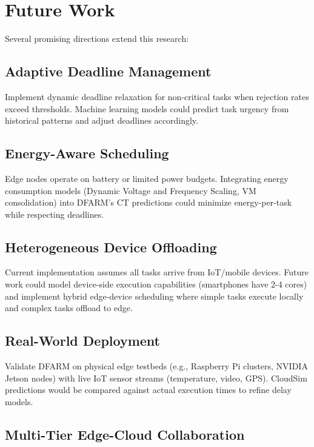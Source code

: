 \documentclass[12pt]{report}
\begin{document}
\section{Future Work}

Several promising directions extend this research:

\subsection{Adaptive Deadline Management}

Implement dynamic deadline relaxation for non-critical tasks when rejection rates exceed thresholds. Machine learning models could predict task urgency from historical patterns and adjust deadlines accordingly.

\subsection{Energy-Aware Scheduling}

Edge nodes operate on battery or limited power budgets. Integrating energy consumption models (Dynamic Voltage and Frequency Scaling, VM consolidation) into DFARM's CT predictions could minimize energy-per-task while respecting deadlines.

\subsection{Heterogeneous Device Offloading}

Current implementation assumes all tasks arrive from IoT/mobile devices. Future work could model device-side execution capabilities (smartphones have 2-4 cores) and implement hybrid edge-device scheduling where simple tasks execute locally and complex tasks offload to edge.

\subsection{Real-World Deployment}

Validate DFARM on physical edge testbeds (e.g., Raspberry Pi clusters, NVIDIA Jetson nodes) with live IoT sensor streams (temperature, video, GPS). CloudSim predictions would be compared against actual execution times to refine delay models.

\subsection{Multi-Tier Edge-Cloud Collaboration}
\end{document}
